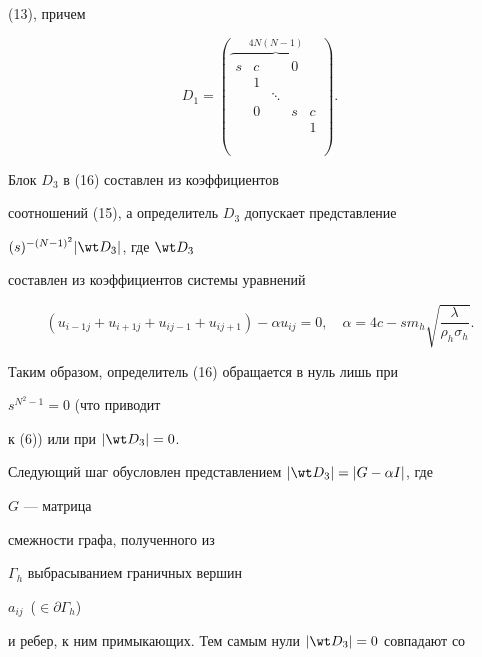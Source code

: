 (13), причем 


$$ 


D_1= 


\left( 


\overbrace{ 


\begin{matrix} 


s & c & \ & 0 & \ \\ 


\ & 1 & \ & \ & \ \\ 


\ & \ & \ddots & \ & \ \\ 


\ & 0 & \ & s & c \\ 


\ & \ & \ & \ & 1 


\end{matrix} 


}^{4N(N-1)} 


\right).


$$ 


Блок $D_3$ в (16) составлен из коэффициентов 


соотношений (15), а определитель $D_3$ допускает представление 


$(s)^{-(N-1)^2}|\wt D_3|$, где $\wt D_3$ 


составлен из коэффициентов системы уравнений 


$$ 


(u_{i-1j}+u_{i+1j}+u_{ij-1}+u_{ij+1})- 


\alpha u_{ij}=0,\quad \alpha=4c-s m_h 


\sqrt{\frac{\lambda}{\rho_h\sigma_h}}. 


$$ 


Таким образом, определитель (16) обращается в нуль лишь при 


$s^{N^2-1}=0$ (что приводит 


к (6)) или при $|\wt D_3|=0$. 


 


Следующий шаг обусловлен представлением $|\wt D_3|=|G-\alpha I|$, где 


$G$ --- матрица 


смежности графа, полученного из 


$\Gamma_h$ выбрасыванием граничных вершин 


$a_{ij}$~($\in\partial\Gamma_h$) 


и ребер, к ним примыкающих. Тем самым нули $|\wt D_3|=0$ совпадают со 



